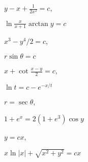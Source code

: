 \documentclass[11pt]{amsbook}
\begin{document}

\begin{hEnumerateArabic}

\item
  \begin{multicols}{2}
    \begin{hEnumerateAlpha}
      \item $y - x + \frac{1}{2x^2} = c$,
      \item $\ln\frac{x}{x+1} \arctan{y} = c$
    \end{hEnumerateAlpha}
  \end{multicols}

\item
  \begin{multicols}{2}
    \begin{hEnumerateAlpha}
      \item $x^3 - y^4/2 = c$,
      \item $r\sin\theta = c$
    \end{hEnumerateAlpha}
  \end{multicols}

\item
  \begin{multicols}{2}
    \begin{hEnumerateAlpha}
      \item $x + \cot\frac{x-y}{2} = c$,
      \item $\ln t = c - e^{-x/t}$
    \end{hEnumerateAlpha}
  \end{multicols}

\item
  \begin{multicols}{2}
    \begin{hEnumerateAlpha}
      \item $r = \sec\theta$,
      \item $1 + e^x = 2(1 + e^3)\cos y$
    \end{hEnumerateAlpha}
  \end{multicols}

\item
  \begin{multicols}{2}
    \begin{hEnumerateAlpha}
      \item $y = cx$,
      \item $x\ln|x| + \sqrt{x^2 + y^2} = cx$
    \end{hEnumerateAlpha}
  \end{multicols}


\end{hEnumerateArabic}
\end{document}
